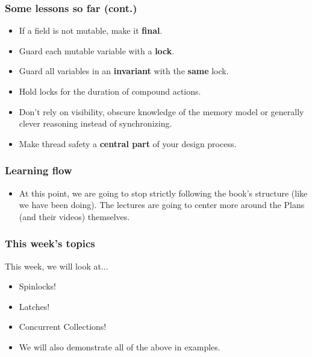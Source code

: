 \documentclass[xcolor={dvipsnames,svgnames},aspectratio=169]{beamer}
\begin{document}
\begin{frame}[fragile]
  \frametitle{Some lessons so far (cont.)}

  \begin{itemize}
  \item[\faBook]<1-> If a field is not mutable, make it \textbf{final}.
  \item[\faBook]<1-> Guard each mutable variable with a \textbf{lock}.
  \item[\faBook]<1-> Guard all variables in an \textbf{invariant} with the
    \textbf{same} lock.
  \item[\faBook]<1-> Hold locks for the duration of compound actions.
  \item[\faBook]<1-> Don’t rely on visibility, obscure knowledge of the memory
    model or generally clever reasoning instead of synchronizing.
  \item[\faBook]<1-> Make thread safety a \textbf{central part} of your design
    process.
  \end{itemize}
\end{frame}

\begin{frame}[fragile]
  \frametitle{Learning flow}

  \begin{itemize}
  \item[\faBook]<1-> At this point, we are going to stop strictly following the book's
    structure (like we have been doing). The lectures are going to center more
    around the Plans (and their videos) themselves.
  \end{itemize}
\end{frame}

\begin{frame}[fragile]
  \frametitle{This week's topics}

  This week, we will look at...

  \begin{itemize}
  \item[\faBook]<1-> Spinlocks!
  \item[\faBook]<1-> Latches!
  \item[\faBook]<1-> Concurrent Collections!
  \end{itemize}

  \begin{itemize}
  \item[\faUserInjured]<2-> We will also demonstrate all of the above in
    examples.
  \end{itemize}
\end{frame}
\end{document}
